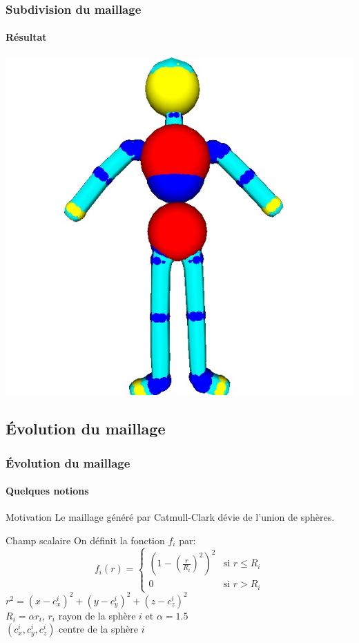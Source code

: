 \documentclass[9pt]{beamer}
\begin{document}
\begin{frame}
	\frametitle{Subdivision du maillage}
	\framesubtitle{Résultat}
	
	\begin{center}
		\includegraphics[scale=0.45]{images/catmullclark.jpg}
	\end{center}
\end{frame}


\subsection{Évolution du maillage}

\begin{frame}
	\frametitle{Évolution du maillage}
	\framesubtitle{Quelques notions}
	
	\begin{block}{Motivation}
		Le maillage généré par Catmull-Clark dévie de l'union de sphères.
	\end{block}
	
	\begin{block}{Champ scalaire}
		On définit la fonction $f_i$ par:
		\begin{equation*}
  			f_i(r)=
     			\begin{cases}
        			\left(1 - \left(\frac{r}{R_i}\right)^2 \right)^2 & \text{si $r \le R_i$} \\
        			0 & \text{si $r > R_i$}
     			\end{cases}
		\end{equation*}
		$r^2 = (x - c_x^i)^2 + (y - c_y^i)^2 + (z - c_z^i)^2$ \\
		$R_i = \alpha r_i$, $r_i$ rayon de la sphère $i$ et $\alpha = 1.5$ \\
		$(c_x^i, c_y^i, c_z^i)$ centre de la sphère $i$
	
	\end{block}
\end{frame}
\end{document}
